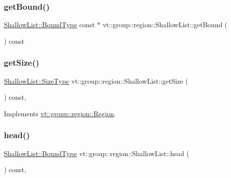 \subsubsection{\texorpdfstring{get\+Bound()}{getBound()}}
{\footnotesize\ttfamily \hyperlink{structvt_1_1group_1_1region_1_1_region_abf426ff85bed72c1c6524fad6a9f1751}{Shallow\+List\+::\+Bound\+Type} const  $\ast$ vt\+::group\+::region\+::\+Shallow\+List\+::get\+Bound (\begin{DoxyParamCaption}{ }\end{DoxyParamCaption}) const\hspace{0.3cm}{\ttfamily [virtual]}}

\mbox{\label{structvt_1_1group_1_1region_1_1_shallow_list_a6b8fe82607fdcf88ac33ad387192fbb2}} 
\subsubsection{\texorpdfstring{get\+Size()}{getSize()}}
{\footnotesize\ttfamily \hyperlink{structvt_1_1group_1_1region_1_1_region_a9bb381adf31111aae34dbc644bad6c1f}{Shallow\+List\+::\+Size\+Type} vt\+::group\+::region\+::\+Shallow\+List\+::get\+Size (\begin{DoxyParamCaption}{ }\end{DoxyParamCaption}) const\hspace{0.3cm}{\ttfamily [override]}, {\ttfamily [virtual]}}



Implements \hyperlink{structvt_1_1group_1_1region_1_1_region_ab0db5f78c57943b4b9973ba2c7c619f7}{vt\+::group\+::region\+::\+Region}.

\mbox{\label{structvt_1_1group_1_1region_1_1_shallow_list_a249b65b9cc1a44131cf52488baea9a41}} 
\subsubsection{\texorpdfstring{head()}{head()}}
{\footnotesize\ttfamily \hyperlink{structvt_1_1group_1_1region_1_1_region_abf426ff85bed72c1c6524fad6a9f1751}{Shallow\+List\+::\+Bound\+Type} vt\+::group\+::region\+::\+Shallow\+List\+::head (\begin{DoxyParamCaption}{ }\end{DoxyParamCaption}) const\hspace{0.3cm}{\ttfamily [override]}, {\ttfamily [virtual]}}



